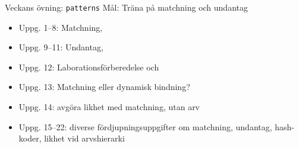 

\ifkompendium\else
{}

\begin{SlideExtra}{Veckans övning: \texttt{patterns}}
  Mål: Träna på matchning och undantag
\begin{itemize}
\item Uppg. 1--8: Matchning, 
\item Uppg. 9--11: Undantag, 
\item Uppg. 12: Laborationsförberedelse  och 
\item Uppg. 13: Matchning eller dynamisk bindning?
\item Uppg. 14: avgöra likhet med matchning,  utan arv
\item Uppg. 15--22: diverse fördjupningsuppgifter om matchning, undantag, hash-koder, likhet vid arvshierarki
\end{itemize}
\end{SlideExtra}


